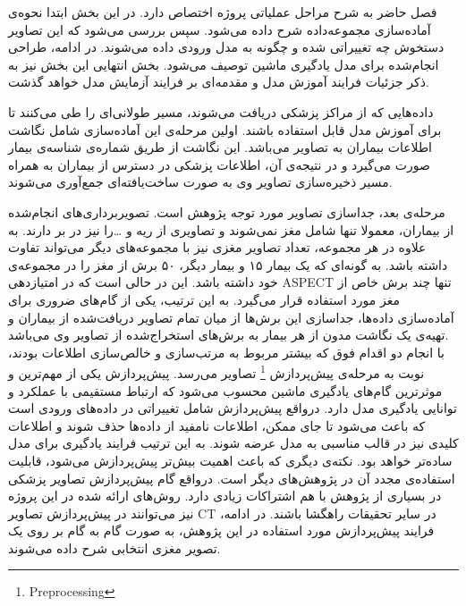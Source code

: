 

فصل حاضر به شرح مراحل عملیاتی پروژه اختصاص دارد.
در این بخش ابتدا نحوه‌ی آماده‌سازی مجموعه‌داده شرح داده می‌شود.
سپس بررسی می‌شود که این تصاویر دستخوش چه تغییراتی شده و چگونه به مدل ورودی داده می‌شوند.
در ادامه، طراحی انجام‌شده برای مدل یادگیری ماشین توصیف می‌شود.
بخش انتهایی این بخش نیز به ذکر 
جزئیات فرایند آموزش مدل و مقدمه‌ای بر فرایند آزمایش مدل خواهد گذشت.


داده‌هایی که از مراکز پزشکی دریافت می‌شوند، مسیر طولانی‌ای را طی می‌کنند تا برای آموزش مدل قابل استفاده باشند.
اولین مرحله‌ی این آماده‌سازی شامل نگاشت اطلاعات بیماران به تصاویر می‌باشد.
این نگاشت از طریق شماره‌ی شناسه‌ی بیمار صورت می‌گیرد 
و در نتیجه‌ی آن، اطلاعات پزشکی در دسترس از بیماران به همراه مسیر ذخیره‌سازی تصاویر وی به صورت ساخت‌یافته‌ای جمع‌آوری می‌شوند.\

مرحله‌ی بعد، جداسازی تصاویر مورد توجه پژوهش است.
تصویربرداری‌های انجام‌شده از بیماران، معمولا تنها شامل مغز نمی‌شوند و تصاویری از ریه و \dots را نیز در بر دارند.
به علاوه در هر مجموعه، تعداد تصاویر مغزی نیز با مجموعه‌های دیگر می‌تواند تفاوت داشته باشد.
به گونه‌ای که یک بیمار ۱۵ و بیمار دیگر، ۵۰ برش از مغز را در مجموعه‌ی خود داشته باشد.
این در حالی است که در امتیازدهی ASPECT تنها چند برش خاص از مغز مورد استفاده قرار می‌گیرد.
به این ترتیب، یکی از گام‌های ضروری برای آماده‌سازی داده‌ها، جداسازی این برش‌ها از میان تمام 
تصاویر دریافت‌شده از بیماران و تهیه‌ی یک نگاشت مدون از هر بیمار به برش‌های استخراج‌شده از تصاویر وی می‌باشد.\\

با انجام دو اقدام فوق که بیشتر مربوط به مرتب‌سازی و خالص‌سازی اطلاعات بودند، نوبت به مرحله‌ی پیش‌پردازش
\footnote{Preprocessing}
تصاویر می‌رسد.
پیش‌پردازش یکی از مهم‌ترین و موثرترین گام‌های یادگیری ماشین محسوب می‌شود که ارتباط مستقیمی با عملکرد و توانایی یادگیری مدل دارد. 
درواقع پیش‌پردازش شامل تغییراتی در داده‌های ورودی است که باعث می‌شود تا جای ممکن، اطلاعات نامفید از داد‌ه‌ها حذف شوند و اطلاعات کلیدی نیز در قالب مناسبی به مدل عرضه شوند.
به این ترتیب فرایند یادگیری برای مدل ساده‌تر خواهد بود.
نکته‌ی دیگری که باعث اهمیت بیش‌تر پیش‌پردازش می‌شود، قابلیت استفاده‌ی مجدد آن در پژوهش‌های دیگر است.
درواقع گام پیش‌پردازش تصاویر پزشکی در بسیاری از پژوهش با هم اشتراکات زیادی دارد.
روش‌های ارائه شده در این پروژه نیز می‌توانند در پیش‌پردازش تصاویر CT در سایر تحقیقات راهگشا باشند.
در ادامه، فرایند پیش‌پردازش مورد استفاده در این پژوهش، به صورت گام به گام بر روی یک تصویر مغزی انتخابی شرح داده می‌شوند.

